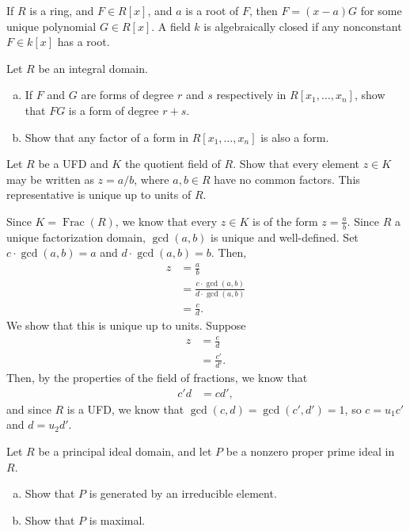 \documentclass[10pt]{mypackage}
\begin{document}
If $R$ is a ring, and $F\in R\left[x\right]$, and $a$ is a root of $F$, then $F = \left(x-a\right)G$ for some unique polynomial $G\in R[x]$. A field $k$ is algebraically closed if any nonconstant $F\in k\left[x\right]$ has a root.
\begin{exercise}[Exercise 1.1]
Let $R$ be an integral domain.
\begin{enumerate}[(a)]
  \item If $F$ and $G$ are forms of degree $r$ and $s$ respectively in $R\left[x_1,\dots,x_n\right]$, show that $FG$ is a form of degree $r+s$.
  \item Show that any factor of a form in $R\left[x_1,\dots,x_n\right]$ is also a form.
\end{enumerate}
\end{exercise}
\begin{exercise}[Exercise 1.2]
  Let $R$ be a UFD and $K$ the quotient field of $R$. Show that every element $z\in K$ may be written as $z = a/b$, where $a,b\in R$ have no common factors. This representative is unique up to units of $R$.
\end{exercise}
\begin{solution}
  Since $K = \operatorname{Frac}\left(R\right)$, we know that every $z\in K$ is of the form $z = \frac{a}{b}$. Since $R$ a unique factorization domain, $\gcd\left(a,b\right)$ is unique and well-defined. Set $c\cdot \gcd\left(a,b\right) = a$ and $d\cdot \gcd\left(a,b\right) = b$. Then,
  \begin{align*}
    z &= \frac{a}{b}\\
      &= \frac{c\cdot \gcd\left(a,b\right)}{d\cdot \gcd\left(a,b\right)}\\
      &= \frac{c}{d}.
  \end{align*}
  We show that this is unique up to units. Suppose
  \begin{align*}
    z &= \frac{c}{d}\\
      &= \frac{c'}{d'}.
  \end{align*}
  Then, by the properties of the field of fractions, we know that
  \begin{align*}
    c'd &= cd',
  \end{align*}
  and since $R$ is a UFD, we know that $\gcd\left(c,d\right) = \gcd\left(c',d'\right) = 1$, so $c = u_1c'$ and $d = u_2d'$.
\end{solution}
\begin{exercise}[Exercise 1.3]
  Let $R$ be a principal ideal domain, and let $P$ be a nonzero proper prime ideal in $R$.
  \begin{enumerate}[(a)]
    \item Show that $P$ is generated by an irreducible element.
    \item Show that $P$ is maximal.
  \end{enumerate}
\end{exercise}
\end{document}
